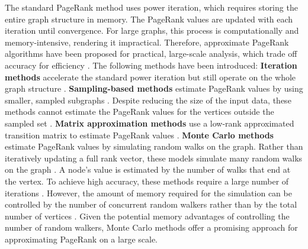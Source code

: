 
The standard PageRank method uses power iteration, which requires storing the entire graph structure in memory. The PageRank values are updated with each iteration until convergence. For large graphs, this process is computationally and memory-intensive, rendering it impractical. Therefore, approximate PageRank algorithms have been proposed for practical, large-scale analysis, which trade off accuracy for efficiency \cite{wu_efficient_2024}. The following methods have been introduced:
\textbf{Iteration methods} \cite{xie_parameterized_2023-1}\cite{anikin_efficient_2022} accelerate the standard power iteration but still operate on the whole graph structure \cite{wu_efficient_2024}. 
\textbf{Sampling-based methods} estimate PageRank values by using smaller, sampled subgraphs \cite{bar-yossef_local_2008}\cite{chen_local_2004}. Despite reducing the size of the input data, these methods cannot estimate the PageRank values for the vertices outside the sampled set \cite{wu_efficient_2024}.
\textbf{Matrix approximation methods} use a low-rank approximated transition matrix to estimate PageRank values \cite{liu_fast_2015}\cite{benczur_feasibility_2005}. 
\textbf{Monte Carlo methods} estimate PageRank values by simulating random walks on the graph. Rather than iteratively updating a full rank vector, these models simulate many random walks on the graph \cite{avrachenkov_monte_2007}. A node's value is estimated by the number of walks that end at the vertex. To achieve high accuracy, these methods require a large number of iterations \cite{wu_efficient_2024}. However, the amount of memory required for the simulation can be controlled by the number of concurrent random walkers rather than by the total number of vertices \cite{avrachenkov_monte_2007}. Given the potential memory advantages of controlling the number of random walkers, Monte Carlo methods offer a promising approach for approximating PageRank on a large scale.
